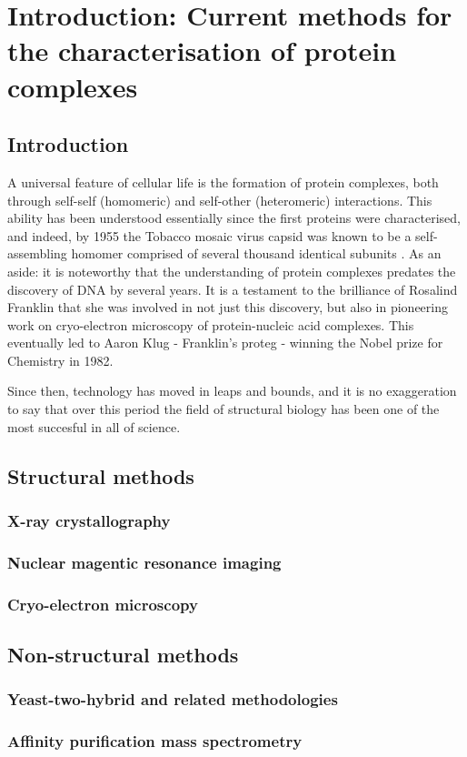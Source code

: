 \documentclass[a4paper,11pt,twoside,openright]{book}
\begin{document}
\chapter{Introduction: Current methods for the characterisation of protein complexes}

\section{Introduction}
A universal feature of cellular life is the formation of protein complexes, both through self-self (homomeric) and self-other (heteromeric) interactions. This ability has been understood essentially since the first proteins were characterised, and indeed, by 1955 the Tobacco mosaic virus capsid was known to be a self-assembling homomer comprised of several thousand identical subunits \supercite{Fraenkel-Conrat1955}. %
As an aside: it is noteworthy that the understanding of protein complexes predates the discovery of DNA by several years. It is a testament to the brilliance of Rosalind Franklin that she was involved in not just this discovery, but also in pioneering work on cryo-electron microscopy of protein-nucleic acid complexes. This eventually led to Aaron Klug - Franklin's proteg - winning the Nobel prize for Chemistry in 1982.

Since then, technology has moved in leaps and bounds, and it is no exaggeration to say that over this period the field of structural biology has been one of the most succesful in all of science.

\section{Structural methods}

\subsection{X-ray crystallography}
\subsection{Nuclear magentic resonance imaging}
\subsection{Cryo-electron microscopy}

\section{Non-structural methods}
\subsection{Yeast-two-hybrid and related methodologies}
\subsection{Affinity purification mass spectrometry}

\printbibliography
\end{document}
